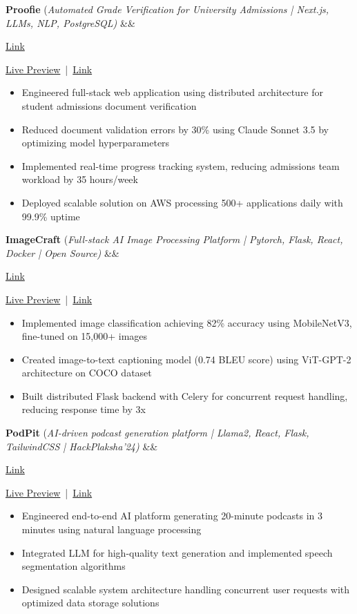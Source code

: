 \documentclass[a4paper]{article}
\newcommand{\bulletSep} { \vspace{1.5mm} }
\newcommand{\linkFont}[1]{
    {\fontfamily{lmtt}\selectfont#1}
}
\newcommand{\link}[2]{
    {\fontfamily{lmtt}\selectfont\href{#1}{#2}}
}
\newcommand{\projectItem}[5]{
    {\textbf{#1}} {(\sl #2)}\hfill
    \ifx&#3&%
    \link{#4}{Link}\\
    \else
    \linkFont{\href{#3}{Live Preview}~|~\href{#4}{Link}}\\
    \fi
    \vspace{2pt}
    \begin{itemize}
        #5
    \end{itemize}
}
\begin{document}
\projectItem{Proofie}{Automated Grade Verification for University Admissions | Next.js, LLMs, NLP, PostgreSQL} {}{proofie.vercel.app}{

    \item Engineered full-stack web application using distributed architecture for student admissions document verification
    \item Reduced document validation errors by 30\% using Claude Sonnet 3.5 by optimizing model hyperparameters
    \item Implemented real-time progress tracking system, reducing admissions team workload by 35 hours/week
    \item Deployed scalable solution on AWS processing 500+ applications daily with 99.9\% uptime
}
\bulletSep

\projectItem{ImageCraft}{Full-stack AI Image Processing Platform | Pytorch, Flask, React, Docker | Open Source}{}{https://image-craft-frontend.vercel.app/}{
    
    \item Implemented image classification achieving 82\% accuracy using MobileNetV3, fine-tuned on 15,000+ images
    \item Created image-to-text captioning model (0.74 BLEU score) using ViT-GPT-2 architecture on COCO dataset
    \item Built distributed Flask backend with Celery for concurrent request handling, reducing response time by 3x
}
\bulletSep


\projectItem{PodPit}{AI-driven podcast generation platform | Llama2, React, Flask, TailwindCSS | HackPlaksha’24}{}{https://devfolio.co/projects/podnews-1159}{
    \item Engineered end-to-end AI platform generating 20-minute podcasts in 3 minutes using natural language processing
    \item Integrated LLM for high-quality text generation and implemented speech segmentation algorithms
    \item Designed scalable system architecture handling concurrent user requests with optimized data storage solutions
}
\end{document}
